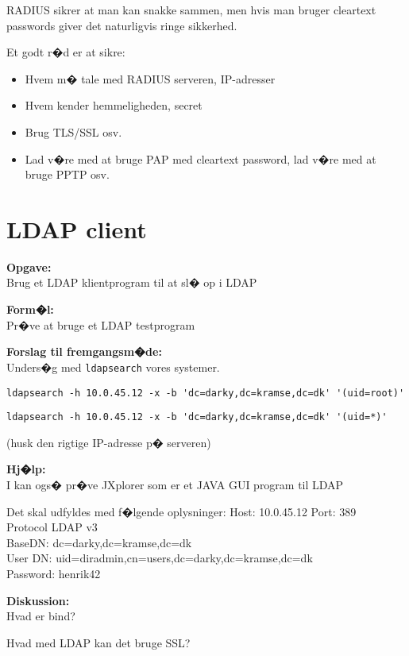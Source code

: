 \documentclass[a4paper,11pt,notitlepage]{oevelser}
\begin{document}
RADIUS sikrer at man kan snakke sammen, men hvis man bruger cleartext passwords giver det naturligvis ringe sikkerhed.

Et godt r�d er at sikre:
\begin{itemize}
\item Hvem m� tale med RADIUS serveren, IP-adresser
\item Hvem kender hemmeligheden, secret
\item Brug TLS/SSL osv.
\item Lad v�re med at bruge PAP med cleartext password, lad v�re med at bruge PPTP osv.
\end{itemize}



\chapter{LDAP client}
\label{ex:ldap-client}

{\bfseries Opgave:}\\
Brug et LDAP klientprogram til at sl� op i LDAP

{\bfseries Form�l:}\\
Pr�ve at bruge et LDAP testprogram

{\bfseries Forslag til fremgangsm�de:}\\
Unders�g med \verb+ldapsearch+ vores systemer.

\verb+ldapsearch -h 10.0.45.12 -x -b 'dc=darky,dc=kramse,dc=dk' '(uid=root)' +

\verb+ldapsearch -h 10.0.45.12 -x -b 'dc=darky,dc=kramse,dc=dk' '(uid=*)'+

(husk den rigtige IP-adresse p� serveren)

{\bfseries Hj�lp:}\\
I kan ogs� pr�ve JXplorer som er et JAVA GUI program til LDAP

Det skal udfyldes med f�lgende oplysninger:
Host: 10.0.45.12 Port: 389\\
Protocol LDAP v3\\
BaseDN: dc=darky,dc=kramse,dc=dk\\
User DN: uid=diradmin,cn=users,dc=darky,dc=kramse,dc=dk\\
Password: henrik42



{\bfseries Diskussion:}\\
Hvad er bind?

Hvad med LDAP kan det bruge SSL?
\end{document}
